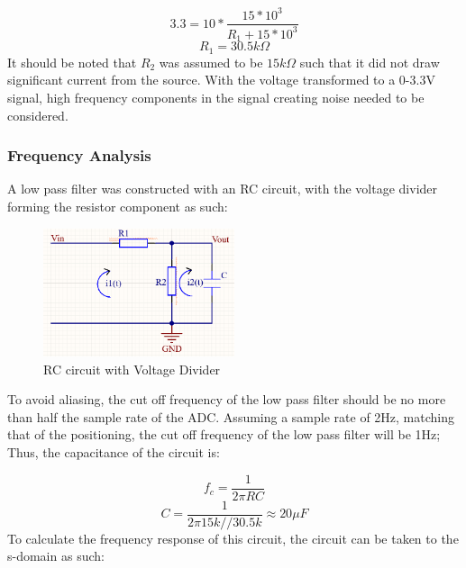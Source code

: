 \documentclass[12pt, a4paper]{article}
\begin{document}
\[3.3=10*\frac{15*10^3}{R_1+15*10^3}\]
\[R_1=30.5k\Omega\]
It should be noted that $R_2$ was assumed to be $15k\Omega$ such that it did not draw significant current from the source. 
With the voltage transformed to a 0-3.3V signal, high frequency components in the signal creating noise needed to be considered. 

\subsubsection{Frequency Analysis}
A low pass filter was constructed with an RC circuit, with the voltage divider forming the resistor component as such:
\begin{figure}[h]
    \centering
    \includegraphics[width=0.5\textwidth]{kvl.png}
    \caption{RC circuit with Voltage Divider}
    \label{fig:rc_w_vdivider}
\end{figure}

To avoid aliasing, the cut off frequency of the low pass filter should be no more than half the sample rate of the ADC. 
Assuming a sample rate of 2Hz, matching that of the positioning, 
the cut off frequency of the low pass filter will be 1Hz; Thus, the capacitance of the circuit is:

\[f_c=\frac{1}{2{\pi}RC}\]
\[C=\frac{1}{2{\pi}15k//30.5k}  {\approx}  20{\mu}F \]
To calculate the frequency response of this circuit, the circuit can be taken to the s-domain as such:
\end{document}
